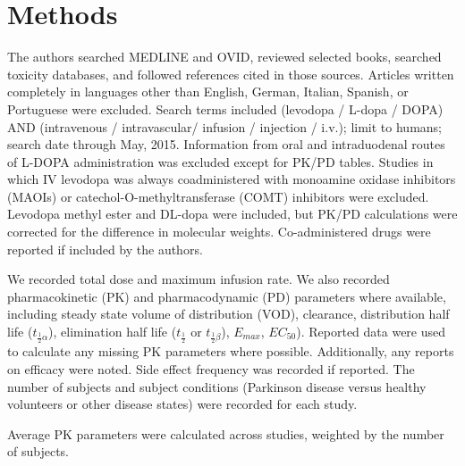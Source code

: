 \section{Methods}
The authors searched MEDLINE and OVID, reviewed selected books, searched toxicity databases, and followed references cited in those sources. Articles written completely in languages other than English, German, Italian, Spanish, or Portuguese were excluded. Search terms included (levodopa / L-dopa / DOPA) AND (intravenous / intravascular/ infusion / injection / i.v.); limit to humans; search date through May, 2015. Information from oral and intraduodenal routes of L-DOPA administration was excluded except for PK/PD tables.  Studies in which IV levodopa was always coadministered with monoamine oxidase inhibitors (MAOIs) or catechol-O-methyltransferase (COMT) inhibitors were excluded.  Levodopa methyl ester \cite{3601092} and DL-dopa \cite{14430381} were included, but PK/PD calculations were corrected for the difference in molecular weights.  Co-administered drugs were reported if included by the authors.

We recorded total dose and maximum infusion rate.  We also recorded pharmacokinetic (PK) and pharmacodynamic (PD) parameters where available, including steady state volume of distribution (VOD), clearance, distribution half life ($t_{\frac{1}{2}\alpha}$), elimination half life ($t_{\frac{1}{2}}$ or $t_{\frac{1}{2}\beta}$), $E_{max}$, $EC_{50}$).   Reported data were used to calculate any missing PK parameters where possible.  Additionally, any reports on efficacy were noted.  Side effect frequency was recorded if reported. The number of subjects and subject conditions (Parkinson disease versus healthy volunteers or other disease states) were recorded for each study. 

Average PK parameters were calculated across studies, weighted by the number of subjects.